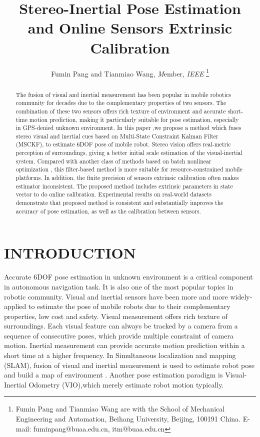 \documentclass[a4paper, 10pt, conference]{ieeeconf}      %
\title{\LARGE \bf
Stereo-Inertial Pose Estimation and Online Sensors 
Extrinsic Calibration
}
\author{Fumin Pang and Tianmiao Wang, \emph Member, \emph {IEEE}%
\thanks{Fumin Pang and Tianmiao Wang are with the School of Mechanical Engineering and
	Automation, Beihang University, Beijing, 100191 China.
        {E-mail: fuminpang@buaa.edu.cn, itm@buaa.edu.cn}}%
}
\begin{document}
\maketitle
\thispagestyle{empty}
\pagestyle{empty}


\begin{abstract}

The fusion of visual and inertial measurement has been popular in mobile robotics community for decades due to the complementary properties of two sensors. The combination of these two sensors offers rich  texture of environment and accurate short-time motion prediction, making it particularly suitable for pose estimation, especially in GPS-denied unknown environment. In this paper ,we propose a method which fuses stereo visual and inertial cues based on Multi-State Constraint Kalman Filter (MSCKF), to estimate 6DOF pose of mobile robot. Stereo vision offers real-metric perception of surroundings, giving a better initial scale estimation of the visual-inertial system. Compared with another class of methods based on batch nonlinear optimization , this filter-based method is more suitable for resource-constrained mobile platforms. In addition, the finite precision of sensors extrinsic calibration often makes estimator inconsistent. The proposed method includes extrinsic parameters in state vector to do online calibration. Experimental results on real-world datasets demonstrate that proposed method is consistent and substantially improves the accuracy of pose estimation, as well as the calibration between sensors.

\end{abstract}


\section{INTRODUCTION}

Accurate 6DOF pose estimation in unknown environment is a critical component in autonomous navigation task. It is also one of the most popular topics in robotic community. Visual and inertial sensors have been more and more widely-applied to estimate the pose of mobile robots due to their complementary properties, low cost and safety. Visual measurement offers rich texture of surroundings. Each visual feature can always be tracked by a camera from a sequence  of consecutive poses, which provide  multiple constraint of camera motion. Inertial measurement can provide accurate motion prediction within a short time at  a higher frequency. In Simultaneous localization and mapping (SLAM), fusion of visual and inertial measurement is used to estimate robot pose and build a map of environment \cite{eade2006scalable} \cite{strelow2004motion}. Another pose estimation paradigm is Visual-Inertial Odometry (VIO),which merely  estimate robot motion typically.
\end{document}

